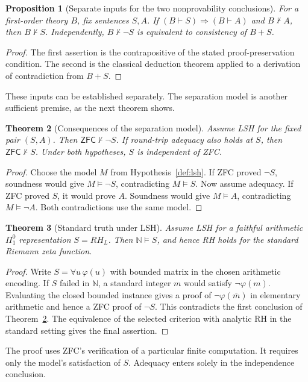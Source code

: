 \documentclass{article}
\newtheorem{theorem}{Theorem}[subsection]
\newtheorem{proposition}[theorem]{Proposition}
\theoremstyle{definition}
\begin{document}
\begin{proposition}[Separate inputs for the two nonprovability conclusions]
\label{prop:two-channels}
For a first-order theory $B$, fix sentences $S,A$. If
$(B\vdash S)\Rightarrow(B\vdash A)$ and $B\nvdash A$, then $B\nvdash S$.
Independently, $B\nvdash\neg S$ is equivalent to consistency of $B+S$.
\end{proposition}
\begin{proof}
The first assertion is the contrapositive of the stated proof-preservation
condition. The second is the classical deduction theorem applied to a
derivation of contradiction from $B+S$.
\end{proof}
These inputs can be established separately. The separation model is another
sufficient premise, as the next theorem shows.

\begin{theorem}[Consequences of the separation model]\label{thm:RH-Lambda}
Assume LSH for the fixed pair $(S,A)$. Then $\mathsf{ZFC}\nvdash\neg S$.
If round-trip adequacy also holds at $S$, then $\mathsf{ZFC}\nvdash S$.
Under both hypotheses, $S$ is independent of ZFC.
\end{theorem}
\begin{proof}
Choose the model $M$ from Hypothesis~\ref{def:lsh}. If ZFC proved
$\neg S$, soundness would give $M\models\neg S$, contradicting
$M\models S$. Now assume adequacy. If ZFC proved $S$, it would
prove $A$. Soundness would give $M\models A$, contradicting
$M\models\neg A$. Both contradictions use the same model.
\end{proof}

\begin{theorem}[Standard truth under LSH]\label{thm:RH-truth}
Assume LSH for a faithful arithmetic $\Pi^0_1$ representation
$S=RH_L$. Then $\mathbb N\models S$, and hence RH holds for the
standard Riemann zeta function.
\end{theorem}
\begin{proof}
Write $S=\forall u\,\varphi(u)$ with bounded matrix in the chosen
arithmetic encoding. If $S$ failed in $\mathbb N$, a standard integer
$m$ would satisfy $\neg\varphi(m)$. Evaluating the closed bounded
instance gives a proof of $\neg\varphi(\bar m)$ in elementary
arithmetic and hence a ZFC proof of $\neg S$. This contradicts the
first conclusion of Theorem~\ref{thm:RH-Lambda}. The equivalence
of the selected criterion with analytic RH in the standard setting
gives the final assertion.
\end{proof}
The proof uses ZFC's verification of a particular finite computation.
It requires only the model's satisfaction of $S$. Adequacy enters
solely in the independence conclusion.
\end{document}
